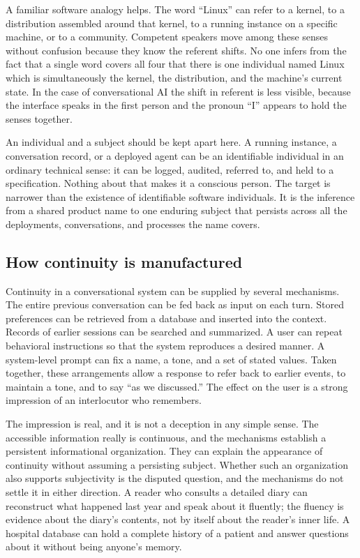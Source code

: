 \documentclass[11pt]{article}
\begin{document}
A familiar software analogy helps. The word ``Linux'' can refer to a kernel, to a distribution assembled around that kernel, to a running instance on a specific machine, or to a community. Competent speakers move among these senses without confusion because they know the referent shifts. No one infers from the fact that a single word covers all four that there is one individual named Linux which is simultaneously the kernel, the distribution, and the machine's current state. In the case of conversational AI the shift in referent is less visible, because the interface speaks in the first person and the pronoun ``I'' appears to hold the senses together.

An individual and a subject should be kept apart here. A running instance, a conversation record, or a deployed agent can be an identifiable individual in an ordinary technical sense: it can be logged, audited, referred to, and held to a specification. Nothing about that makes it a conscious person. The target is narrower than the existence of identifiable software individuals. It is the inference from a shared product name to one enduring subject that persists across all the deployments, conversations, and processes the name covers.

\subsection{How continuity is manufactured}

Continuity in a conversational system can be supplied by several mechanisms. The entire previous conversation can be fed back as input on each turn. Stored preferences can be retrieved from a database and inserted into the context. Records of earlier sessions can be searched and summarized. A user can repeat behavioral instructions so that the system reproduces a desired manner. A system-level prompt can fix a name, a tone, and a set of stated values. Taken together, these arrangements allow a response to refer back to earlier events, to maintain a tone, and to say ``as we discussed.'' The effect on the user is a strong impression of an interlocutor who remembers.

The impression is real, and it is not a deception in any simple sense. The accessible information really is continuous, and the mechanisms establish a persistent informational organization. They can explain the appearance of continuity without assuming a persisting subject. Whether such an organization also supports subjectivity is the disputed question, and the mechanisms do not settle it in either direction. A reader who consults a detailed diary can reconstruct what happened last year and speak about it fluently; the fluency is evidence about the diary's contents, not by itself about the reader's inner life. A hospital database can hold a complete history of a patient and answer questions about it without being anyone's memory.
\end{document}

